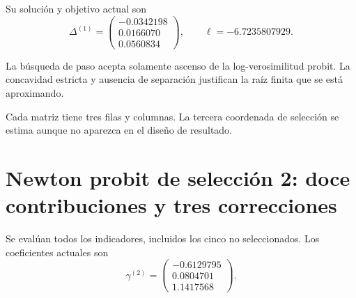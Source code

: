 \documentclass[11pt,a4paper]{article}
\begin{document}
Su solución y objetivo actual son
\[
\Delta^{(1)}=\begin{pmatrix}-0.0342198\\0.0166070\\0.0560834\end{pmatrix},\qquad\ell=-6.7235807929.
\]

La búsqueda de paso
acepta solamente ascenso
de la log-verosimilitud probit.
La concavidad estricta y
ausencia de separación
justifican la raíz finita
que se está aproximando.

Cada matriz tiene tres
filas y columnas.
La tercera coordenada
de selección se estima
aunque no aparezca
en el diseño de resultado.

\clearpage
\section{Newton probit de selección 2: doce contribuciones y tres correcciones}\label{unidad157}
Se evalúan todos los indicadores,
incluidos los cinco no seleccionados.
Los coeficientes actuales son
\[
\gamma^{(2)}=\begin{pmatrix}-0.6129795\\0.0804701\\1.1417568\end{pmatrix}.
\]
\end{document}
